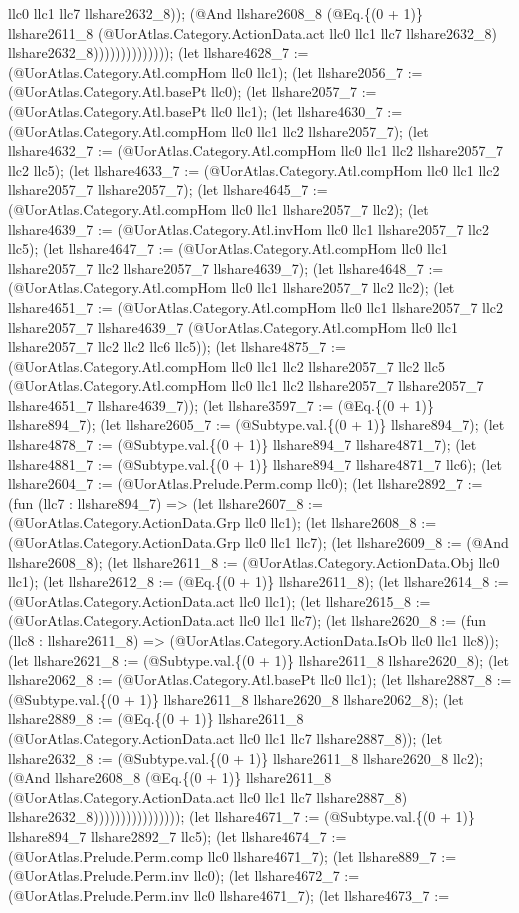 \documentclass[11pt]{article}
\begin{document}
llc0 llc1 llc7 llshare2632\_8)); (@And llshare2608\_8 (@Eq.\{(0 + 1)\} llshare2611\_8 (@UorAtlas.Category.ActionData.act llc0 llc1 llc7 llshare2632\_8) llshare2632\_8)))))))))))))); (let llshare4628\_7 := (@UorAtlas.Category.Atl.compHom llc0 llc1); (let llshare2056\_7 := (@UorAtlas.Category.Atl.basePt llc0); (let llshare2057\_7 := (@UorAtlas.Category.Atl.basePt llc0 llc1); (let llshare4630\_7 := (@UorAtlas.Category.Atl.compHom llc0 llc1 llc2 llshare2057\_7); (let llshare4632\_7 := (@UorAtlas.Category.Atl.compHom llc0 llc1 llc2 llshare2057\_7 llc2 llc5); (let llshare4633\_7 := (@UorAtlas.Category.Atl.compHom llc0 llc1 llc2 llshare2057\_7 llshare2057\_7); (let llshare4645\_7 := (@UorAtlas.Category.Atl.compHom llc0 llc1 llshare2057\_7 llc2); (let llshare4639\_7 := (@UorAtlas.Category.Atl.invHom llc0 llc1 llshare2057\_7 llc2 llc5); (let llshare4647\_7 := (@UorAtlas.Category.Atl.compHom llc0 llc1 llshare2057\_7 llc2 llshare2057\_7 llshare4639\_7); (let llshare4648\_7 := (@UorAtlas.Category.Atl.compHom llc0 llc1 llshare2057\_7 llc2 llc2); (let llshare4651\_7 := (@UorAtlas.Category.Atl.compHom llc0 llc1 llshare2057\_7 llc2 llshare2057\_7 llshare4639\_7 (@UorAtlas.Category.Atl.compHom llc0 llc1 llshare2057\_7 llc2 llc2 llc6 llc5)); (let llshare4875\_7 := (@UorAtlas.Category.Atl.compHom llc0 llc1 llc2 llshare2057\_7 llc2 llc5 (@UorAtlas.Category.Atl.compHom llc0 llc1 llc2 llshare2057\_7 llshare2057\_7 llshare4651\_7 llshare4639\_7)); (let llshare3597\_7 := (@Eq.\{(0 + 1)\} llshare894\_7); (let llshare2605\_7 := (@Subtype.val.\{(0 + 1)\} llshare894\_7); (let llshare4878\_7 := (@Subtype.val.\{(0 + 1)\} llshare894\_7 llshare4871\_7); (let llshare4881\_7 := (@Subtype.val.\{(0 + 1)\} llshare894\_7 llshare4871\_7 llc6); (let llshare2604\_7 := (@UorAtlas.Prelude.Perm.comp llc0); (let llshare2892\_7 := (fun (llc7 : llshare894\_7) => (let llshare2607\_8 := (@UorAtlas.Category.ActionData.Grp llc0 llc1); (let llshare2608\_8 := (@UorAtlas.Category.ActionData.Grp llc0 llc1 llc7); (let llshare2609\_8 := (@And llshare2608\_8); (let llshare2611\_8 := (@UorAtlas.Category.ActionData.Obj llc0 llc1); (let llshare2612\_8 := (@Eq.\{(0 + 1)\} llshare2611\_8); (let llshare2614\_8 := (@UorAtlas.Category.ActionData.act llc0 llc1); (let llshare2615\_8 := (@UorAtlas.Category.ActionData.act llc0 llc1 llc7); (let llshare2620\_8 := (fun (llc8 : llshare2611\_8) => (@UorAtlas.Category.ActionData.IsOb llc0 llc1 llc8)); (let llshare2621\_8 := (@Subtype.val.\{(0 + 1)\} llshare2611\_8 llshare2620\_8); (let llshare2062\_8 := (@UorAtlas.Category.Atl.basePt llc0 llc1); (let llshare2887\_8 := (@Subtype.val.\{(0 + 1)\} llshare2611\_8 llshare2620\_8 llshare2062\_8); (let llshare2889\_8 := (@Eq.\{(0 + 1)\} llshare2611\_8 (@UorAtlas.Category.ActionData.act llc0 llc1 llc7 llshare2887\_8)); (let llshare2632\_8 := (@Subtype.val.\{(0 + 1)\} llshare2611\_8 llshare2620\_8 llc2); (@And llshare2608\_8 (@Eq.\{(0 + 1)\} llshare2611\_8 (@UorAtlas.Category.ActionData.act llc0 llc1 llc7 llshare2887\_8) llshare2632\_8)))))))))))))))); (let llshare4671\_7 := (@Subtype.val.\{(0 + 1)\} llshare894\_7 llshare2892\_7 llc5); (let llshare4674\_7 := (@UorAtlas.Prelude.Perm.comp llc0 llshare4671\_7); (let llshare889\_7 := (@UorAtlas.Prelude.Perm.inv llc0); (let llshare4672\_7 := (@UorAtlas.Prelude.Perm.inv llc0 llshare4671\_7); (let llshare4673\_7 := 
\end{document}

